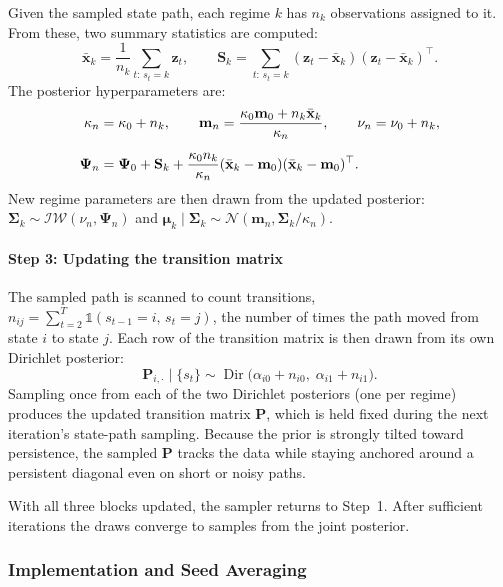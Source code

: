 Given the sampled state path, each regime $k$ has $n_k$ observations assigned to it. From these, two summary statistics are computed:
\[
\bar{\mathbf{x}}_k = \frac{1}{n_k}\sum_{t:\,s_t=k}\mathbf{z}_t, \qquad \mathbf{S}_k = \sum_{t:\,s_t=k}(\mathbf{z}_t - \bar{\mathbf{x}}_k)(\mathbf{z}_t - \bar{\mathbf{x}}_k)^\top.
\]
The posterior hyperparameters are:
\begin{align}\label{eq:niw_update}
\kappa_n &= \kappa_0 + n_k, \qquad
\mathbf{m}_n = \frac{\kappa_0 \mathbf{m}_0 + n_k \bar{\mathbf{x}}_k}{\kappa_n}, \qquad
\nu_n = \nu_0 + n_k, \notag \\[6pt]
\boldsymbol{\Psi}_n &= \boldsymbol{\Psi}_0 + \mathbf{S}_k + \frac{\kappa_0 n_k}{\kappa_n}(\bar{\mathbf{x}}_k-\mathbf{m}_0)(\bar{\mathbf{x}}_k-\mathbf{m}_0)^\top.
\end{align}
New regime parameters are then drawn from the updated posterior:
$\boldsymbol{\Sigma}_k \sim \mathcal{IW}(\nu_n,\boldsymbol{\Psi}_n)$ and
$\boldsymbol{\mu}_k \mid \boldsymbol{\Sigma}_k \sim \mathcal{N}(\mathbf{m}_n, \boldsymbol{\Sigma}_k / \kappa_n)$.

\paragraph{Step 3: Updating the transition matrix}

The sampled path is scanned to count transitions, $n_{ij} = \sum_{t=2}^T \mathds{1}(s_{t-1}=i,\, s_t=j)$, the number of times the path moved from state $i$ to state $j$. Each row of the transition matrix is then drawn from its own Dirichlet posterior:
\begin{equation}
\mathbf{P}_{i,\cdot} \mid \{s_t\}
\sim
\operatorname{Dir}\bigl(\alpha_{i0} + n_{i0},\; \alpha_{i1} + n_{i1}\bigr).
\label{eq:dirichlet_update}
\end{equation}
Sampling once from each of the two Dirichlet posteriors (one per regime) produces the updated transition matrix $\mathbf{P}$, which is held fixed during the next iteration's state-path sampling. Because the prior is strongly tilted toward persistence, the sampled $\mathbf{P}$ tracks the data while staying anchored around a persistent diagonal even on short or noisy paths.

With all three blocks updated, the sampler returns to Step~1. After sufficient iterations the draws converge to samples from the joint posterior.

\subsubsection{Implementation and Seed Averaging}\label{sec:implementation}

